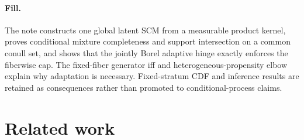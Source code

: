\documentclass{article}
\begin{document}
\paragraph{Fill.} The note constructs one global latent SCM from a measurable product kernel, proves conditional mixture completeness and support intersection on a common conull set, and shows that the jointly Borel adaptive hinge exactly enforces the fiberwise cap. The fixed-fiber generator iff and heterogeneous-propensity elbow explain why adaptation is necessary. Fixed-stratum CDF and inference results are retained as consequences rather than promoted to conditional-process claims.

\section{Related work}
\end{document}
